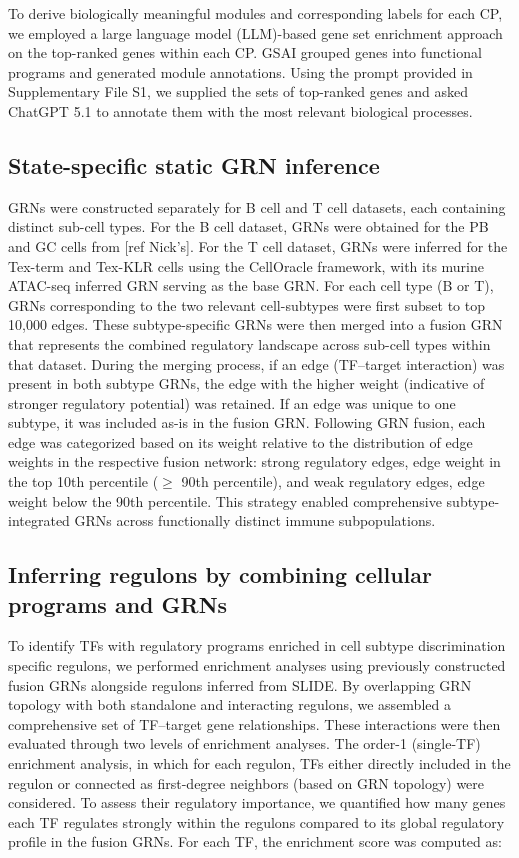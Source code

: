 \documentclass[11pt]{article}
\begin{document}
To derive biologically meaningful modules and corresponding labels for each CP, we
employed a large language model (LLM)-based gene set enrichment approach on the
top-ranked genes within each CP. GSAI grouped genes into functional programs and
generated module annotations. Using the prompt provided in Supplementary File S1, we
supplied the sets of top-ranked genes and asked ChatGPT 5.1 to annotate them with the
most relevant biological processes.

\subsection*{State-specific static GRN inference}

GRNs were constructed separately for B cell and T cell datasets, each containing
distinct sub-cell types. For the B cell dataset, GRNs were obtained for the PB and GC
cells from [ref Nick's]. For the T cell dataset, GRNs were inferred for the Tex-term
and Tex-KLR cells using the CellOracle framework, with its murine ATAC-seq inferred GRN
serving as the base GRN. For each cell type (B or T), GRNs corresponding to the two
relevant cell-subtypes were first subset to top 10{,}000 edges. These subtype-specific
GRNs were then merged into a fusion GRN that represents the combined regulatory
landscape across sub-cell types within that dataset. During the merging process, if an
edge (TF--target interaction) was present in both subtype GRNs, the edge with the higher
weight (indicative of stronger regulatory potential) was retained. If an edge was unique
to one subtype, it was included as-is in the fusion GRN. Following GRN fusion, each edge
was categorized based on its weight relative to the distribution of edge weights in the
respective fusion network: strong regulatory edges, edge weight in the top 10th
percentile ($\geq$ 90th percentile), and weak regulatory edges, edge weight below the
90th percentile. This strategy enabled comprehensive subtype-integrated GRNs across
functionally distinct immune subpopulations.

\subsection*{Inferring regulons by combining cellular programs and GRNs}

To identify TFs with regulatory programs enriched in cell subtype discrimination
specific regulons, we performed enrichment analyses using previously constructed fusion
GRNs alongside regulons inferred from SLIDE. By overlapping GRN topology with both
standalone and interacting regulons, we assembled a comprehensive set of TF--target gene
relationships. These interactions were then evaluated through two levels of enrichment
analyses. The order-1 (single-TF) enrichment analysis, in which for each regulon, TFs
either directly included in the regulon or connected as first-degree neighbors (based on
GRN topology) were considered. To assess their regulatory importance, we quantified how
many genes each TF regulates strongly within the regulons compared to its global
regulatory profile in the fusion GRNs. For each TF, the enrichment score was computed as:
\end{document}
